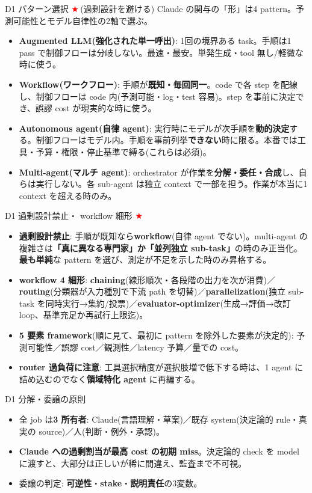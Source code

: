 \documentclass[10pt,a4paper]{article}
\newcommand{\R}[1]{\textcolor{cred}{\textbf{#1}}}
\newcommand{\B}[1]{\textcolor{cblue}{\textbf{#1}}}
\newcommand{\stc}{\textcolor{red}{\ensuremath{\bigstar}}\,}
\begin{document}
\begin{minipage}[t]{0.333\textwidth}

\begin{boxblue}{D1 パターン選択 \stc (過剰設計を避ける)}
Claude の関与の「形」は4 pattern。予測可能性とモデル自律性の2軸で選ぶ。
\begin{itemize}
\item \R{Augmented LLM(強化された単一呼出)}: 1回の境界ある task。手順は1 pass で制御フローは分岐しない。最速・最安。単発生成・tool 無し/軽微な時に使う。
\item \R{Workflow(ワークフロー)}: 手順が\B{既知・毎回同一}。code で各 step を配線し、制御フローは code 内(予測可能・log・test 容易)。step を事前に決定でき、誤謬 cost が現実的な時に使う。
\item \R{Autonomous agent(自律 agent)}: 実行時にモデルが次手順を\B{動的決定}する。制御フローはモデル内。手順を事前列挙\B{できない}時に限る。本番では工具・予算・権限・停止基準で縛る(これらは必須)。
\item \R{Multi-agent(マルチ agent)}: orchestrator が作業を\B{分解・委任・合成}し、自らは実行しない。各 sub-agent は独立 context で一部を担う。作業が本当に1 context を超える時のみ。
\end{itemize}
\end{boxblue}

\begin{boxblue}{D1 過剰設計禁止・ workflow 細形 \stc}
\begin{itemize}
\item \R{過剰設計禁止}: 手順が既知なら\R{workflow}(自律 agent でない)。multi-agent の複雑さは\B{「真に異なる専門家」か「並列独立 sub-task」}の時のみ正当化。\B{最も単純}な pattern を選び、測定が不足を示した時のみ昇格する。
\item \R{workflow 4 細形}: \B{chaining}(線形順次・各段階の出力を次が消費)／\B{routing}(分類器が入力種別で下流 path を切替)／\B{parallelization}(独立 sub-task を同時実行→集約/投票)／\B{evaluator-optimizer}(生成→評価→改訂 loop、基準充足か再試行上限迄)。
\item \R{5 要素 framework}(順に見て、最初に pattern を除外した要素が決定的): 予測可能性／誤謬 cost／観測性／latency 予算／量での cost。
\item \R{router 過負荷に注意}: 工具選択精度が選択肢増で低下する時は、1 agent に詰め込むのでなく\R{領域特化 agent} に再編する。
\end{itemize}
\end{boxblue}

\begin{boxblue}{D1 分解・委譲の原則}
\begin{itemize}
\item 全 job は\B{3 所有者}: Claude(言語理解・草案)／既存 system(決定論的 rule・真実の source)／人(判断・例外・承認)。
\item \R{Claude への過剰割当が最高 cost の初期 miss}。決定論的 check を model に渡すと、大部分は正しいが稀に間違え、監査まで不可視。
\item 委譲の判定: \B{可逆性}・\B{stake}・\B{説明責任}の3変数。
\end{itemize}
\end{boxblue}

\end{minipage}
\end{document}
